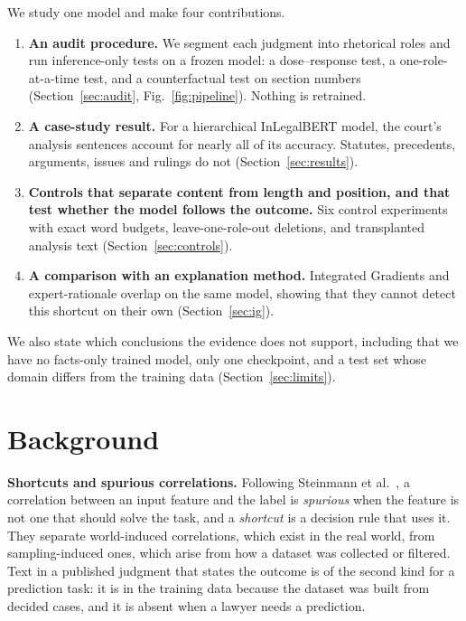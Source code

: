 \documentclass[conference]{IEEEtran}
\begin{document}
We study one model and make four contributions.
\begin{enumerate}[leftmargin=*]
    \item \textbf{An audit procedure.} We segment each judgment into rhetorical roles and run inference-only tests on a frozen model: a dose--response test, a one-role-at-a-time test, and a counterfactual test on section numbers (Section~\ref{sec:audit}, Fig.~\ref{fig:pipeline}). Nothing is retrained.
    \item \textbf{A case-study result.} For a hierarchical InLegalBERT model, the court's analysis sentences account for nearly all of its accuracy. Statutes, precedents, arguments, issues and rulings do not (Section~\ref{sec:results}).
    \item \textbf{Controls that separate content from length and position, and that test whether the model follows the outcome.} Six control experiments with exact word budgets, leave-one-role-out deletions, and transplanted analysis text (Section~\ref{sec:controls}).
    \item \textbf{A comparison with an explanation method.} Integrated Gradients and expert-rationale overlap on the same model, showing that they cannot detect this shortcut on their own (Section~\ref{sec:ig}).
\end{enumerate}
We also state which conclusions the evidence does not support, including that we have no facts-only trained model, only one checkpoint, and a test set whose domain differs from the training data (Section~\ref{sec:limits}).

\section{Background}
\label{sec:background}
\textbf{Shortcuts and spurious correlations.} Following Steinmann et al.\ \cite{steinmann2024navigating}, a correlation between an input feature and the label is \textit{spurious} when the feature is not one that should solve the task, and a \textit{shortcut} is a decision rule that uses it. They separate world-induced correlations, which exist in the real world, from sampling-induced ones, which arise from how a dataset was collected or filtered. Text in a published judgment that states the outcome is of the second kind for a prediction task: it is in the training data because the dataset was built from decided cases, and it is absent when a lawyer needs a prediction.
\end{document}
